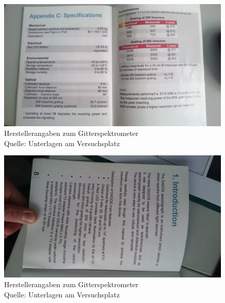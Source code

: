 		\begin{figure}[H]
			\center
			\includegraphics[scale=0.085, angle=0]{referenzen/DSC_0689.JPG}
			\caption{Herstellerangaben zum Gitterspektrometer \\ Quelle: Unterlagen am Versuchsplatz}
			\label{fig:sonnenspektrum-1}
		\end{figure}

		\begin{figure}[H]
			\center
			\includegraphics[scale=0.085, angle=0]{referenzen/DSC_0690.JPG}
			\caption{Herstellerangaben zum Gitterspektrometer \\ Quelle: Unterlagen am Versuchsplatz}
			\label{fig:sonnenspektrum-1}
		\end{figure}

